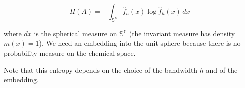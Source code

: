 \[ H(A) = -\int_\mathbb{{S}^n}  \hat{f}_h(x)\log  \hat{f}_h(x) \,dx  \]



where $dx$ is the \href{\href{https://en.wikipedia.org/wiki/Spherical_measure}{http://}}{spherical measure} on $\mathbb{{S}^n}$ (the invariant measure has density $m(x)=1$). We need an embedding into the unit sphere because there is no probability measure on the chemical space.

Note that this entropy depends on the choice of the bandwidth $h$ and of the embedding.
